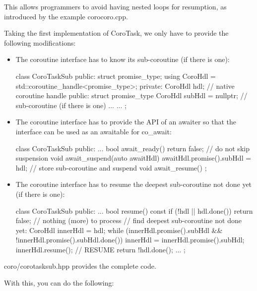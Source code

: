 This allows programmers to avoid having nested loops for resumption, as introduced by the example corocoro.cpp.

Taking the first implementation of CoroTask, we only have to provide the following modifications:

\begin{itemize}
\item 
The coroutine interface has to know its sub-coroutine (if there is one):

\begin{cpp}
class CoroTaskSub {
public:
	struct promise_type;
	using CoroHdl = std::coroutine_handle<promise_type>;
private:
	CoroHdl hdl; // native coroutine handle
public:
	struct promise_type {
		CoroHdl subHdl = nullptr; // sub-coroutine (if there is one)
		...
	}
	...
};
\end{cpp}

\item
The coroutine interface has to provide the API of an awaiter so that the interface can be used as an awaitable for co\_await:

\begin{cpp}
class CoroTaskSub {
	public:
	...
	bool await_ready() { return false; } // do not skip suspension
	void await_suspend(auto awaitHdl) {
		awaitHdl.promise().subHdl = hdl; // store sub-coroutine and suspend
	}
	void await_resume() { }
};
\end{cpp}

\item
The coroutine interface has to resume the deepest sub-coroutine not done yet (if there is one):

\begin{cpp}
class CoroTaskSub {
	public:
	...
	bool resume() const {
		if (!hdl || hdl.done()) {
			return false; // nothing (more) to process
		}
		// find deepest sub-coroutine not done yet:
		CoroHdl innerHdl = hdl;
		while (innerHdl.promise().subHdl && !innerHdl.promise().subHdl.done()) {
			innerHdl = innerHdl.promise().subHdl;
		}
		innerHdl.resume(); // RESUME
		return !hdl.done();
	}
	...
};
\end{cpp}
\end{itemize}

coro/corotasksub.hpp provides the complete code.

With this, you can do the following:


